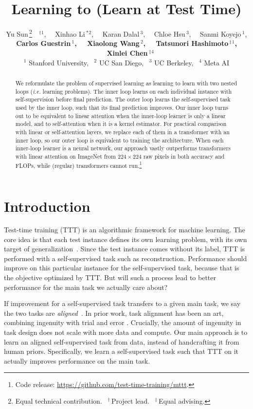 \documentclass{article}
\title{Learning to (Learn at Test Time)}
\author{
Yu Sun\,\thanks{Equal technical contribution.
                ~$^\dag$\,Project lead.
                ~$^\ddag$\,Equal advising.}~~$^\dag$$^1$,
~~Xinhao Li\,$^*$$^2$,
~~Karan Dalal\,$^3$,
~~Chloe Hsu\,$^3$,
~~Sanmi Koyejo\,$^1$,\\
\textbf{
Carlos Guestrin\,$^1$,
~~Xiaolong Wang\,$^2$,
~~Tatsunori Hashimoto\,$^\ddag$$^1$,
~~Xinlei Chen\,$^\ddag$$^4$
}\\
$^1$ Stanford University, 
~$^2$ UC San Diego, 
~$^3$ UC Berkeley, 
~$^4$ Meta AI
}
\begin{document}
\maketitle

\begin{abstract}
We reformulate the problem of supervised learning as learning to learn with two nested loops (\textit{i.e.} learning problems).
The inner loop learns on each individual instance with self-supervision before final prediction.
The outer loop learns the self-supervised task used by the inner loop, such that its final prediction improves.
Our inner loop turns out to be equivalent to linear attention when the inner-loop learner is only a linear model, and to self-attention when it is a kernel estimator.
For practical comparison with linear or self-attention layers, we replace each of them in a transformer with an inner loop, so our outer loop is equivalent to training the architecture.
When each inner-loop learner is a neural network, our approach vastly outperforms transformers with linear attention on ImageNet from $224\times 224$ raw pixels in both accuracy and FLOPs, while (regular) transformers cannot run.\footnote{
Code release: \url{https://github.com/test-time-training/mttt}.

}
\end{abstract}

\section{Introduction}
\label{sec:intro}
Test-time training (TTT) is an algorithmic framework for machine learning.
The core idea is that each test instance defines its own learning problem, with its own target of generalization~\citep{sun2020test}.
Since the test instance comes without its label, TTT is performed with a self-supervised task such as reconstruction.
Performance should improve on this particular instance for the self-supervised task, because that is the objective optimized by TTT.
But will such a process lead to better performance for the main task we actually care about?

If improvement for a self-supervised task transfers to a given main task, we say the two tasks are \emph{aligned}~\citep{sun2020test}.
In prior work, task alignment has been an art, combining ingenuity with trial and error \citep{ttt-mae, wang2023test}.
Crucially, the amount of ingenuity in task design does not scale with more data and compute.
Our main approach is to learn an aligned self-supervised task from data, instead of handcrafting it from human priors.
Specifically, we learn a self-supervised task such that TTT on it actually improves performance on the main task.
\end{document}
